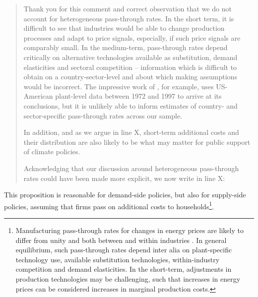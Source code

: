 \documentclass[11pt]{article}
\newenvironment{response}
{\begin{quote}\color{black}}
{\end{quote}}
\begin{document}
\begin{response}
    Thank you for this comment and correct observation that we do not account for heterogeneous pass-through rates. In the short term, it is difficult to see that industries would be able to change production processes and adapt to price signals, especially, if such price signals are comparably small. In the medium-term, pass-through rates depend critically on alternative technologies available as substitution, demand elasticities and sectoral competition -- information which is difficult to obtain on a country-sector-level and about which making assumptions would be incorrect. The impressive work of \textcite{Ganapati.2020}, for example, uses US-American plant-level data between 1972 and 1997 to arrive at its conclusions, but it is unlikely able to inform estimates of country- and sector-specific pass-through rates across our sample. 
    
    In addition, and as we argue in line X, short-term additional costs and their distribution are also likely to be what may matter for public support of climate policies.

    Acknowledging that our discussion around heterogeneous pass-through rates could have been made more explicit, we now write in line X:

\end{response}

\begin{revisionbox}
    This proposition is reasonable for demand-side policies, but also for supply-side policies, assuming that firms pass on additional costs to households\footnote{Manufacturing pass-through rates for changes in energy prices are likely to differ from unity and both between and within industries \autocite{Ganapati.2020,Cludius.2020}. In general equilibrium, such pass-through rates depend inter alia on plant-specific technology use, available substitution technologies, within-industry competition and demand elasticities. In the short-term, adjustments in production technologies may be challenging, such that increases in energy prices can be considered increases in marginal production costs.}.
\end{revisionbox}
\end{document}
